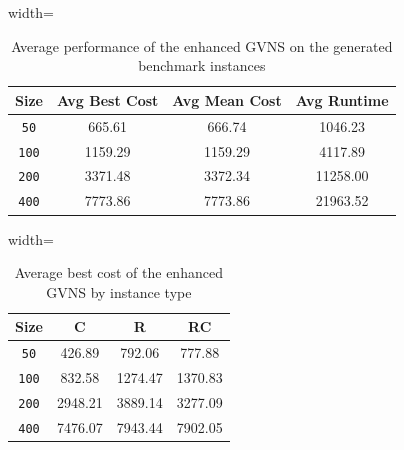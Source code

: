 \documentclass{article}
\begin{document}
\begin{table}[ht]
\centering
\small
\setlength{\tabcolsep}{4pt}
\caption{Average performance of the enhanced GVNS on the generated benchmark instances}
\vspace{4mm}
\begin{adjustbox}{width=\textwidth}
\begin{tabular}{c c c c}
\toprule
Size & Avg Best Cost & Avg Mean Cost & Avg Runtime \\
\midrule
\texttt{50} & 665.61 & 666.74 & 1046.23 \\
\texttt{100} & 1159.29 & 1159.29 & 4117.89 \\
\texttt{200} & 3371.48 & 3372.34 & 11258.00 \\
\texttt{400} & 7773.86 & 7773.86 & 21963.52 \\
\bottomrule
\end{tabular}
\end{adjustbox}
\end{table}

\begin{table}[ht]
\centering
\small
\setlength{\tabcolsep}{4pt}
\caption{Average best cost of the enhanced GVNS by instance type}
\vspace{4mm}
\begin{adjustbox}{width=\textwidth}
\begin{tabular}{c c c c}
\toprule
Size & C & R & RC \\
\midrule
\texttt{50} & 426.89 & 792.06 & 777.88 \\
\texttt{100} & 832.58 & 1274.47 & 1370.83 \\
\texttt{200} & 2948.21 & 3889.14 & 3277.09 \\
\texttt{400} & 7476.07 & 7943.44 & 7902.05 \\
\bottomrule
\end{tabular}
\end{adjustbox}
\end{table}
\end{document}
